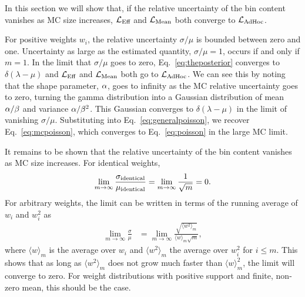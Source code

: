In this section we will show that, if the relative uncertainty of the bin content vanishes as MC size increases, $\mathcal{L}_\textmd{Eff}$ and $\mathcal{L}_{\textmd{Mean}}$ both converge to $\mathcal{L}_{\textmd{AdHoc}}$.

For positive weights $w_i$, the relative uncertainty $\sigma/\mu$ is bounded between zero and one.
Uncertainty as large as the estimated quantity, $\sigma/\mu=1$, occurs if and only if $m=1$.
In the limit that $\sigma/\mu$ goes to zero, Eq.~\eqref{eq:theposterior} converges to $\delta(\lambda - \mu)$ and $\mathcal{L}_\textmd{Eff}$ and $\mathcal{L}_{\textmd{Mean}}$ both go to $\mathcal{L}_{\textmd{AdHoc}}$.
We can see this by noting that the shape parameter, $\alpha$, goes to infinity as the MC relative uncertainty goes to zero, turning the gamma distribution into a Gaussian distribution of mean $\alpha / \beta$ and variance $\alpha / \beta^2$.
This Gaussian converges to $\delta(\lambda-\mu)$ in the limit of vanishing $\sigma/\mu$.
Substituting into Eq.~\eqref{eq:generalpoisson}, we recover Eq.~\eqref{eq:mcpoisson}, which converges to Eq.~\eqref{eq:poisson} in the large MC limit.

It remains to be shown that the relative uncertainty of the bin content vanishes as MC size increases.
For identical weights,
\begin{equation}
\lim_{m\to\infty} \frac{\sigma_{\rm identical}}{\mu_{\rm identical}} = \lim_{m\to\infty} \frac{1}{\sqrt{m}} = 0 .
\end{equation}
For arbitrary weights, the limit can be written in terms of the running average of $w_i$ and $w_i^2$ as
\begin{align}
\lim_{m\to\infty} \frac{\sigma}{\mu} &= \lim_{m\to\infty} \frac{\sqrt{\langle w^2 \rangle_m}}{\langle w\rangle_m\sqrt{m}},
\end{align}
where $\langle w \rangle_m$ is the average over $w_i$ and $\langle w^2 \rangle_m$ the average over $w_i^2$ for $i \leq m$.
This shows that as long as $\langle w^2 \rangle_m$ does not grow much faster than $\langle w \rangle_m^2$, the limit will converge to zero.
For weight distributions with positive support and finite, non-zero mean, this should be the case.
